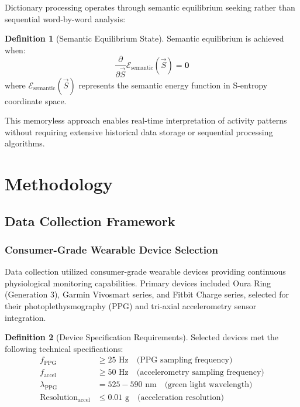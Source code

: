\documentclass[12pt,a4paper]{article}
\theoremstyle{definition}
\newtheorem{definition}{Definition}[section]
\begin{document}
Dictionary processing operates through semantic equilibrium seeking rather than sequential word-by-word analysis:

\begin{definition}[Semantic Equilibrium State]
Semantic equilibrium is achieved when:
\begin{equation}
\frac{\partial}{\partial \vec{S}} \mathcal{E}_{\text{semantic}}(\vec{S}) = \mathbf{0}
\end{equation}
where $\mathcal{E}_{\text{semantic}}(\vec{S})$ represents the semantic energy function in S-entropy coordinate space.
\end{definition}

This memoryless approach enables real-time interpretation of activity patterns without requiring extensive historical data storage or sequential processing algorithms.


\section{Methodology}

\subsection{Data Collection Framework}

\subsubsection{Consumer-Grade Wearable Device Selection}

Data collection utilized consumer-grade wearable devices providing continuous physiological monitoring capabilities. Primary devices included Oura Ring (Generation 3), Garmin Vivosmart series, and Fitbit Charge series, selected for their photoplethysmography (PPG) and tri-axial accelerometry sensor integration.

\begin{definition}[Device Specification Requirements]
Selected devices met the following technical specifications:
\begin{align}
f_{\text{PPG}} &\geq 25 \text{ Hz} \quad \text{(PPG sampling frequency)} \\
f_{\text{accel}} &\geq 50 \text{ Hz} \quad \text{(accelerometry sampling frequency)} \\
\lambda_{\text{PPG}} &= 525-590 \text{ nm} \quad \text{(green light wavelength)} \\
\text{Resolution}_{\text{accel}} &\leq 0.01 \text{ g} \quad \text{(acceleration resolution)}
\end{align}
\end{definition}
\end{document}
